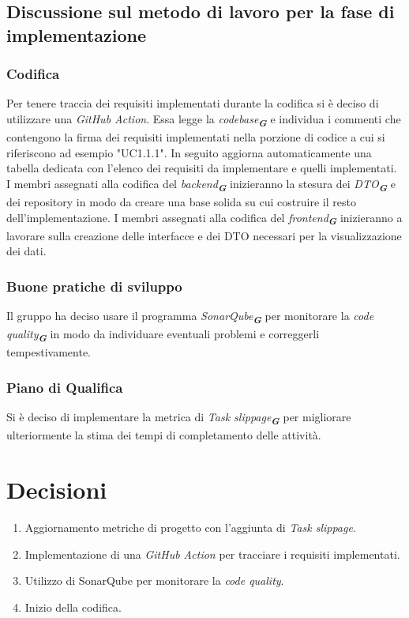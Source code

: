 \documentclass[a4paper,12pt]{article}
\newcommand{\glossario}[1]{\textit{#1}\textsubscript{\textbf{\textit{\textcolor{lightblack}{G}}}}}
\begin{document}
\subsection{Discussione sul metodo di lavoro per la fase di implementazione}

\subsubsection{Codifica}
Per tenere traccia dei requisiti implementati durante la codifica si è deciso di utilizzare una \textit{GitHub Action}. Essa legge la \glossario{codebase} e individua i commenti che contengono la firma dei requisiti implementati nella porzione di codice a cui si riferiscono ad esempio "UC1.1.1". In seguito aggiorna automaticamente una tabella dedicata con l'elenco dei requisiti da implementare e quelli implementati.\\

I membri assegnati alla codifica del \glossario{backend} inizieranno la stesura dei \glossario{DTO} e dei repository in modo da creare una base solida su cui costruire il resto dell'implementazione. I membri assegnati alla codifica del \glossario{frontend} inizieranno a lavorare sulla creazione delle interfacce e dei DTO necessari per la visualizzazione dei dati.\\


\subsubsection{Buone pratiche di sviluppo}
Il gruppo ha deciso usare il programma \glossario{SonarQube} per monitorare la \glossario{code quality} in modo da individuare eventuali problemi e correggerli tempestivamente.\\

\subsubsection{Piano di Qualifica}
Si è deciso di implementare la metrica di \glossario{Task slippage} per migliorare ulteriormente la stima dei tempi di completamento delle attività.

\section{Decisioni}
\begin{enumerate}
    \item Aggiornamento metriche di progetto con l'aggiunta di \textit{Task slippage}.
    \item Implementazione di una \textit{GitHub Action} per tracciare i requisiti implementati.
    \item Utilizzo di SonarQube per monitorare la \textit{code quality}.
    \item Inizio della codifica.
\end{enumerate}
\end{document}
